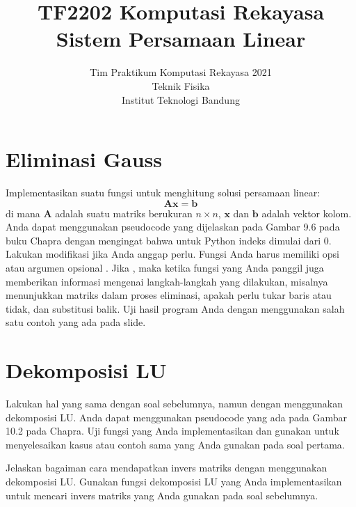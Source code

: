 



\title{%
{\small TF2202 Komputasi Rekayasa}\\
Sistem Persamaan Linear
}
\author{Tim Praktikum Komputasi Rekayasa 2021\\
Teknik Fisika\\
Institut Teknologi Bandung}
\date{}
\maketitle


\section{Eliminasi Gauss}

\begin{soal}
Implementasikan suatu fungsi untuk menghitung solusi persamaan linear:
\begin{equation*}
\mathbf{A}\mathbf{x} = \mathbf{b}
\end{equation*}
di mana $\mathbf{A}$ adalah suatu matriks berukuran $n \times n$, 
$\mathbf{x}$ dan $\mathbf{b}$ adalah vektor kolom.
Anda dapat menggunakan pseudocode yang dijelaskan pada Gambar 9.6
pada buku Chapra dengan mengingat bahwa untuk Python indeks dimulai dari 0.
Lakukan modifikasi jika Anda anggap perlu.
Fungsi Anda harus memiliki opsi atau argumen opsional .
Jika , maka ketika fungsi yang Anda panggil juga
memberikan informasi mengenai langkah-langkah yang dilakukan, misalnya
menunjukkan matriks dalam proses eliminasi, apakah perlu tukar baris atau tidak,
dan substitusi balik. Uji hasil program Anda dengan menggunakan salah satu contoh
yang ada pada slide.
\end{soal}


\section{Dekomposisi LU}

\begin{soal}
Lakukan hal yang sama dengan soal sebelumnya, namun dengan menggunakan
dekomposisi LU.
Anda dapat menggunakan pseudocode yang ada pada Gambar 10.2 pada Chapra.
Uji fungsi yang Anda implementasikan dan gunakan untuk menyelesaikan
kasus atau contoh sama yang Anda gunakan pada soal pertama.
\end{soal}

\begin{soal}
Jelaskan bagaiman cara mendapatkan invers matriks dengan menggunakan
dekomposisi LU. Gunakan fungsi dekomposisi LU yang Anda implementasikan
untuk mencari invers matriks yang Anda gunakan pada soal sebelumnya.
\end{soal}



